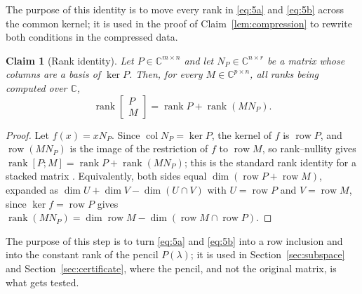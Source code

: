 \documentclass[journal]{IEEEtran}
\theoremstyle{plainn}
\newtheorem{claim}{Claim}
\theoremstyle{remark}
\begin{document}
The purpose of this identity is to move every rank in \eqref{eq:5a} and \eqref{eq:5b} across the common kernel; it is used in the proof of Claim~\ref{lem:compression} to rewrite both conditions in the compressed data.

\begin{claim}[Rank identity]\label{lem:rankid}
Let $P\in\mathbb C^{m\times n}$ and let $N_P\in\mathbb C^{n\times r}$ be a matrix whose columns are a basis of $\ker P$. Then, for every $M\in\mathbb C^{p\times n}$, all ranks being computed over $\mathbb C$,
\begin{equation}\label{eq:rankid}
\operatorname{rank}\begin{bmatrix}P\\ M\end{bmatrix}
=\operatorname{rank}P+\operatorname{rank}(MN_P).
\end{equation}
\end{claim}

\begin{proof}
Let $f(x)=xN_P$. Since $\operatorname{col}N_P=\ker P$, the kernel of $f$ is $\operatorname{row}P$,
and $\operatorname{row}(MN_P)$ is the image of the restriction of $f$ to $\operatorname{row}M$, so
rank--nullity gives $\operatorname{rank}[P;M]=\operatorname{rank}P+\operatorname{rank}(MN_P)$; this
is the standard rank identity for a stacked matrix \cite[Ch.~0]{hj13}. Equivalently, both sides equal
$\dim(\operatorname{row}P+\operatorname{row}M)$, expanded as
$\dim U+\dim V-\dim(U\cap V)$ with $U=\operatorname{row}P$ and $V=\operatorname{row}M$, since
$\ker f=\operatorname{row}P$ gives
$\operatorname{rank}(MN_P)=\dim\operatorname{row}M-\dim(\operatorname{row}M\cap\operatorname{row}P)$.
\end{proof}

The purpose of this step is to turn \eqref{eq:5a} and \eqref{eq:5b} into a row inclusion and into the constant rank of the pencil $P(\lambda)$; it is used in Section~\ref{sec:subspace} and Section~\ref{sec:certificate}, where the pencil, and not the original matrix, is what gets tested.
\end{document}
